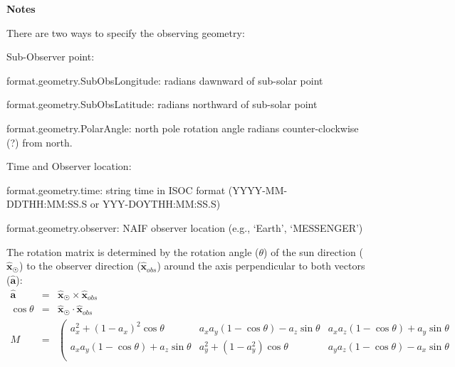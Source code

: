 \documentclass[11pt]{article}
\newcommand\descrip[1]{\textsf{\textbf{\large{#1}}}\\}
\begin{document}
\descrip{Notes}
\begin{compactenum} \listup
\item There are two ways to specify the observing geometry:
  \begin{compactenum} 
  \item Sub-Observer point:
    \begin{compactitem}
    \item format.geometry.SubObsLongitude: radians dawnward of sub-solar point
    \item format.geometry.SubObsLatitude: radians northward of sub-solar point
    \item format.geometry.PolarAngle: north pole rotation angle radians 
    counter-clockwise (?) from north.
    \end{compactitem}
  \item Time and Observer location:
    \begin{compactitem}
    \item format.geometry.time: string time in ISOC format 
    (YYYY-MM-DDTHH:MM:SS.S or YYY-DOYTHH:MM:SS.S)
    \item format.geometry.observer: NAIF observer location (e.g., `Earth', 
    `MESSENGER')
    \end{compactitem}
  \end{compactenum}
  \item The rotation matrix is determined by the rotation angle ($\theta$) of 
  the sun direction ($\mathbf{\hat{x}}_{\astrosun}$) to the observer direction
  ($\mathbf{\hat{x}}_{obs}$) around the axis perpendicular to 
  both vectors ($\mathbf{\hat{a}}$):
    \begin{eqnarray}
    \mathbf{\hat{a}} & = & \mathbf{\hat{x}}_{\astrosun} \times 
      \mathbf{\hat{x}}_{obs} \\
    \cos \theta & = & \mathbf{\hat{x}_{\astrosun}} \cdot \mathbf{\hat{x}}_{obs}
      \\
    M & = & \left( \begin{array}{ccc}
      a_x^2 + (1-a_x)^2 \cos \theta & 
      a_x a_y (1-\cos \theta)-a_z \sin \theta & 
      a_x a_z (1-\cos \theta)+a_y \sin \theta \\

      a_x a_y (1-\cos \theta) + a_z \sin \theta & 
      a_y^2 + (1-a_y^2) \cos \theta & 
      a_y a_z (1-\cos \theta) - a_x \sin \theta \\


\end{array}
\end{eqnarray}
\end{compactenum}
\end{document}
